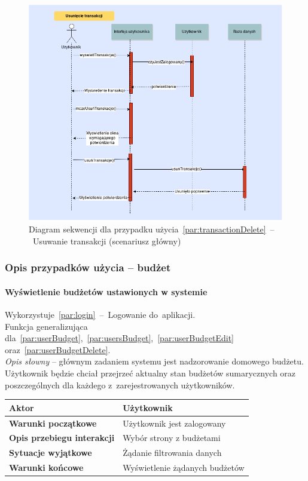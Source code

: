 \begin{figure}[H]
  \includegraphics[width=\textwidth]{images/usun_transakcje.png}
  \caption{Diagram sekwencji dla przypadku użycia~\ref{par:transactionDelete}~--~Usuwanie transakcji (scenariusz główny)}
\end{figure}

\subsubsection{Opis przypadków użycia -- budżet}


\paragraph{Wyświetlenie budżetów ustawionych w systemie\newline}
\label{par:budgetsList}
Wykorzystuje~\ref{par:login}~--~Logowanie do~aplikacji.\\
\indent Funkcja generalizująca dla~\ref{par:userBudget},~\ref{par:usersBudget},~\ref{par:userBudgetEdit} oraz~\ref{par:userBudgetDelete}.\\

\textit{Opis słowny} -- głównym zadaniem systemu jest nadzorowanie domowego budżetu. Użytkownik będzie chciał przejrzeć aktualny stan budżetów sumarycznych oraz poszczególnych dla każdego z~zarejestrowanych użytkowników.

\begin{longtable}{|p{5cm}|p{7cm}|}
  \hline \textbf{Aktor} & Użytkownik \\
  \hline \textbf{Warunki początkowe} & Użytkownik jest zalogowany \\
  \hline \textbf{Opis przebiegu interakcji} & Wybór strony z budżetami \\
  \hline \textbf{Sytuacje wyjątkowe} & Żądanie filtrowania danych \\
  \hline \textbf{Warunki końcowe} & Wyświetlenie żądanych budżetów \\
  \hline
\end{longtable}

